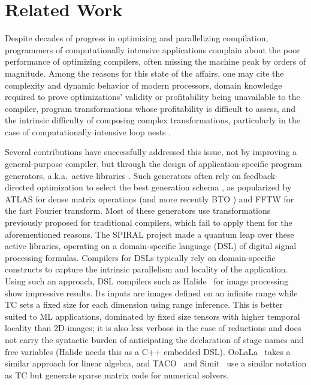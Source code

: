\section{Related Work}

Despite decades of progress in optimizing and parallelizing
compilation, programmers of computationally intensive applications
complain about the poor performance of optimizing compilers, often
missing the machine peak by orders of magnitude. Among
the reasons for this state of the affairs, one may cite the complexity
and dynamic behavior of modern processors, domain knowledge required
to prove optimizations' validity or profitability being unavailable to
the compiler, program transformations whose profitability is difficult
to assess, and the intrinsic difficulty of composing complex
transformations, particularly in the case of computationally intensive
loop nests \cite{URUK,Clay}.

Several contributions have successfully addressed this issue, not by improving
a general-purpose compiler, but through the design of
application-specific program generators, a.k.a.\ active libraries
\cite{VG98}. Such generators often rely on feedback-directed
optimization to select the best generation schema \cite{Smi00}, as
popularized by ATLAS \cite{ATLAS} for dense matrix operations (and more
recently BTO \cite{BTO09}) and FFTW
\cite{FFTW} for the fast Fourier transform.
Most of these generators use transformations previously proposed for
traditional compilers, which fail to apply them for the aforementioned
reasons. The SPIRAL project
\cite{SPIRAL} made a quantum leap over these active libraries, operating on a
domain-specific language (DSL) of digital signal processing formulas.
Compilers for DSLs typically rely on domain-specific constructs to capture the
intrinsic parallelism and locality of the application.  Using such an
approach, DSL compilers such as Halide~\cite{Halide} for image processing show
impressive results. Its inputs are images defined on an infinite range while
TC sets a fixed size for each dimension using range inference. This is better
suited to ML applications, dominated by fixed size tensors with
higher temporal locality than 2D-images; it is also less verbose in the case of
reductions and does not carry the syntactic burden of anticipating the declaration of stage
names and free variables (Halide needs this as a C++ embedded DSL).
OoLaLa~\cite{OoLaLa} takes a similar approach for linear algebra, and
TACO~\cite{Taco} and Simit~\cite{Simit} use a similar notation as TC but
generate sparse matrix code for numerical solvers.

